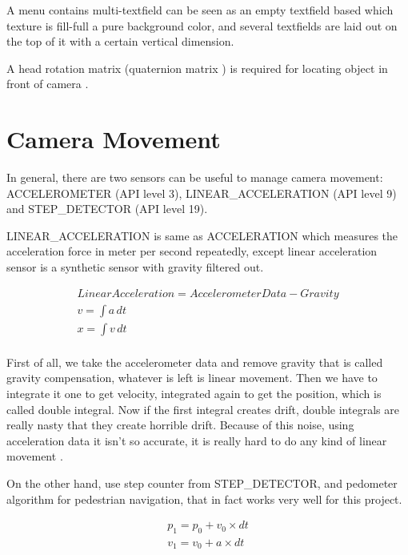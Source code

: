 A menu contains multi-textfield can be seen as an empty textfield based which texture is fill-full a pure background color, and several textfields are laid out on the top of it with a certain vertical dimension.

A head rotation matrix (quaternion matrix \cite{jvv.quaternions.2013}) is required for locating object in front of camera \cite{mathworks.quaternion-rotation.2016}.

\section{Camera Movement}

In general, there are two sensors can be useful to manage camera movement: ACCELEROMETER (API level 3), LINEAR\_ACCELERATION (API level 9) and STEP\_DETECTOR (API level 19). 

LINEAR\_ACCELERATION is same as ACCELERATION which measures the acceleration force in meter per second repeatedly, except linear acceleration sensor is a synthetic sensor with gravity filtered out. 

\[
\begin{array}{lr}
Linear Acceleration = Accelerometer Data - Gravity\\
v = \int a\,dt\\
x = \int v\,dt\\
\end{array}
\]

First of all, we take the accelerometer data and remove gravity that is called gravity compensation, whatever is left is linear movement. Then we have to integrate it one to get velocity, integrated again to get the position, which is called double integral. Now if the first integral creates drift, double integrals are really nasty that they create horrible drift. Because of this noise, using acceleration data it isn't so accurate, it is really hard to do any kind of linear movement \cite{google.sensor-fusion.2010}.

On the other hand, use step counter from STEP\_DETECTOR, and pedometer algorithm for pedestrian navigation, that in fact works very well for this project.

\[
\begin{array}{lr}
p_1 = p_0 + v_0 \times dt\\
v_1 = v_0 + a \times dt\\
\end{array}
\]

